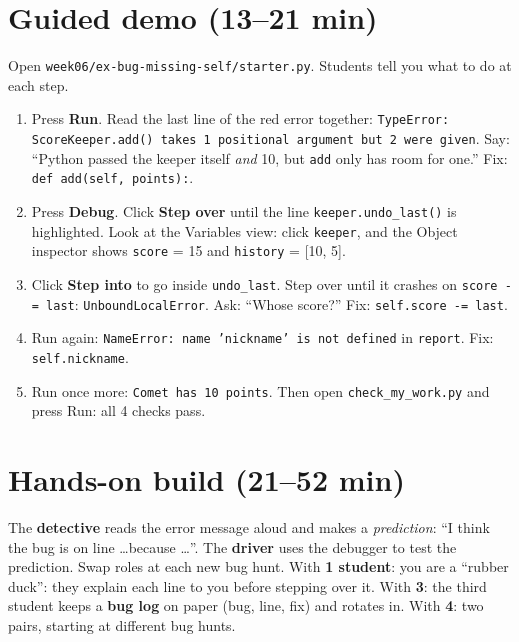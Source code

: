 \section{Guided demo (13--21 min)}
\begin{workedexample}
Open \texttt{week06/ex-bug-missing-self/starter.py}. Students tell you what to do at each step.
\begin{enumerate}[itemsep=2pt]
  \item Press \textbf{Run}. Read the last line of the red error together: \texttt{TypeError: ScoreKeeper.add() takes 1 positional argument but 2 were given}. Say: \enquote{Python passed the keeper itself \emph{and} 10, but \texttt{add} only has room for one.} Fix: \texttt{def add(self, points):}.
  \item Press \textbf{Debug}. Click \textbf{Step over} until the line \texttt{keeper.undo\_last()} is highlighted. Look at the Variables view: click \texttt{keeper}, and the Object inspector shows \texttt{score} = 15 and \texttt{history} = [10, 5].
  \item Click \textbf{Step into} to go inside \texttt{undo\_last}. Step over until it crashes on \texttt{score -= last}: \texttt{UnboundLocalError}. Ask: \enquote{Whose score?} Fix: \texttt{self.score -= last}.
  \item Run again: \texttt{NameError: name 'nickname' is not defined} in \texttt{report}. Fix: \texttt{self.nickname}.
  \item Run once more: \texttt{Comet has 10 points}. Then open \texttt{check\_my\_work.py} and press Run: all 4 checks pass.
\end{enumerate}
\end{workedexample}

\section{Hands-on build (21--52 min)}
\begin{pairroles}
The \textbf{detective} reads the error message aloud and makes a \emph{prediction}: \enquote{I think the bug is on line \ldots because \ldots}. The \textbf{driver} uses the debugger to test the prediction. Swap roles at each new bug hunt.
With \textbf{1 student}: you are a \enquote{rubber duck}: they explain each line to you before stepping over it. With \textbf{3}: the third student keeps a \textbf{bug log} on paper (bug, line, fix) and rotates in. With \textbf{4}: two pairs, starting at different bug hunts.
\end{pairroles}

